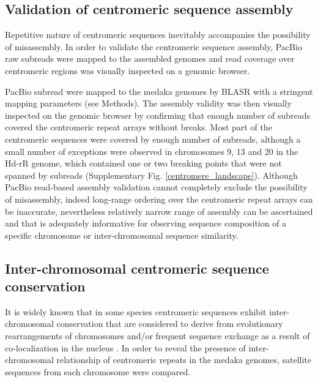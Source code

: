 \subsection*{Validation of centromeric sequence assembly}
  Repetitive nature of centromeric sequences inevitably accompanies the possibility of misassembly. In order to validate the centromeric sequence assembly, PacBio raw subreads were mapped to the assembled genomes and read coverage over centromeric regions was visually inspected on a genomic browser.

  PacBio subread were mapped to the medaka genomes by BLASR \cite{} with a stringent mapping parameters (see Methods). The assembly validity was then visually inspected on the genomic browser by confirming that enough number of subreads covered the centromeric repeat arrays without breaks. Most part of the centromeric sequences were covered by enough number of subreads, although a small number of exceptions were observed in chromosomes 9, 13 and 20 in the Hd-rR genome, which contained one or two breaking points that were not spanned by subreads (Supplementary Fig. \ref{centromere_landscape}). Although PacBio read-based assembly validation cannot completely exclude the possibility of misassembly, indeed long-range ordering over the centromeric repeat arrays can be inaccurate, nevertheless relatively narrow range of assembly can be ascertained and that is adequately informative for observing sequence composition of a specific chromosome or inter-chromosomal sequence similarity.


\subsection*{Inter-chromosomal centromeric sequence conservation}
  It is widely known that in some species centromeric sequences exhibit inter-chromosomal conservation that are considered to derive from evolutionary rearrangements of chromosomes and/or frequent sequence exchange as a result of co-localization in the nucleus \cite{Willard1991}. In order to reveal the presence of inter-chromosomal relationship of centromeric repeats in the medaka genomes, satellite sequences from each chromosome were compared.

